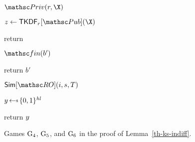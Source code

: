 \begin{figure}[tp]
	\begin{minipage}[t]{0.48\textwidth}
		
		\ExptSepSpace
		\begin{algorithm}{$\PrivO(\roIndex,\X)$}
			\item $z \gets\TLSKDF_{\roIndex}[\PubO](\X)$
			\item return 
		\end{algorithm}	
		\ExptSepSpace
		\begin{algorithm}{$\Finalize(b')$}
			\item {}
			\item return $b'$
		\end{algorithm}
	\end{minipage}
	\vline
	\hspace{.02\textwidth}
	\begin{minipage}[t]{0.8\textwidth}
		\NewExperiment[Game $\Gm_6$]

		\begin{oracle}{$\simulator[\RO](\simIndex, \simInString,\rlookuptable)$}
			\item $\simOut \getsr \bits^{\hashlen}$
			\item return $y$
		\end{oracle}
		
	\end{minipage}
	
	\label{fig:gm456-ks-indiff}
	\caption{ Games $\textnormal{G}_4$, $\textnormal{G}_5$, and $\Gm_6$ in the proof of Lemma~\ref{th-ks-indiff}.}
\end{figure}
